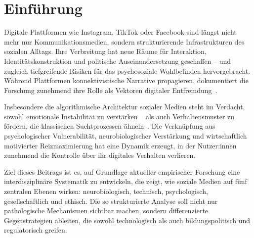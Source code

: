
\section{Einführung}\label{sec:introduction}

Digitale Plattformen wie Instagram, TikTok oder Facebook sind längst nicht mehr nur Kommunikationsmedien, sondern
strukturierende Infrastrukturen des sozialen Alltags.
Ihre Verbreitung hat neue Räume für Interaktion, Identitätskonstruktion und politische Auseinandersetzung geschaffen –
und zugleich tiefgreifende Risiken für das psychosoziale Wohlbefinden hervorgebracht.
Während Plattformen konnektivistische Narrative propagieren, dokumentiert die Forschung zunehmend ihre Rolle als Vektoren
digitaler Entfremdung~\cite{rey_alienation_2012,milli_engagement_2024,santini_social_2024}.

Insbesondere die algorithmische Architektur sozialer Medien steht im Verdacht, sowohl emotionale Instabilität zu verstärken
~\cite{doi:10.1073/pnas.1320040111} als auch Verhaltensmuster zu fördern, die klassischen Suchtprozessen ähneln~\cite{de_social_nodate}.
Die Verknüpfung aus psychologischer Vulnerabilität, neurobiologischer Verstärkung und wirtschaftlich motivierter Reizmaximierung
hat eine Dynamik erzeugt, in der Nutzer:innen zunehmend die Kontrolle über ihr digitales Verhalten verlieren.

Ziel dieses Beitrags ist es, auf Grundlage aktueller empirischer Forschung eine interdisziplinäre Systematik zu entwickeln,
die zeigt, wie soziale Medien auf fünf zentralen Ebenen wirken: neurobiologisch, technisch, psychologisch, gesellschaftlich
und ethisch.
Die so strukturierte Analyse soll nicht nur pathologische Mechanismen sichtbar machen, sondern differenzierte Gegenstrategien
ableiten, die sowohl technologisch als auch bildungspolitisch und regulatorisch greifen.
